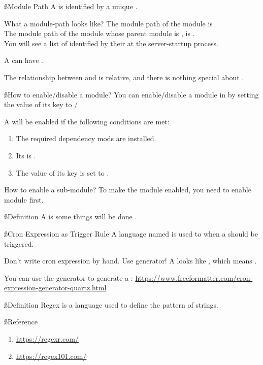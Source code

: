 \ss{Module Path}
A  is identified by a unique .

\begin{example}{What a module-path looks like?}
    The module path of the module  is . \\
    The module path of the module  whose parent module is , is . \\
    You will see a list of  identified by their  at the server-startup process.
\end{example}

A  can have .

The relationship between  and  is relative, and there is nothing special about .

\ss{How to enable/disable a module?}
You can enable/disable a module in  by setting the value of its  key to /
\begin{samepage}
    A  will be enabled if the following conditions are met:
    \begin{enumerate}
        \item The required dependency mods are installed.
        \item Its  is .
        \item The value of its  key is set to .
    \end{enumerate}
\end{samepage}

\begin{example}{How to enable a sub-module?}
    To make the module  enabled, you need to enable  module first.
\end{example}


\clearpage
{}\label{sec:job}

\ss{Definition}
A  is some things will be done .

\ss{Cron Expression as Trigger Rule}
A language named  is used to  when a  should be triggered.

\begin{tips}{Don't write cron expression by hand. Use generator!}
    A  looks like , which means .

    You can use the generator to generate a :
    \url{https://www.freeformatter.com/cron-expression-generator-quartz.html}
\end{tips}

\clearpage
{}

\ss{Definition}
Regex is a language used to define the pattern of strings.

\ss{Reference}
\begin{enumerate}
    \item \url{https://regexr.com/}
    \item \url{https://regex101.com/}
\end{enumerate}




